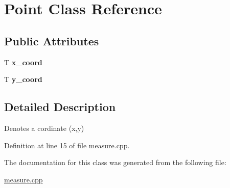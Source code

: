 \hypertarget{classPoint}{}\section{Point Class Reference}
\label{classPoint}
\subsection*{Public Attributes}
\begin{DoxyCompactItemize}
\item 
\mbox{\label{classPoint_a4a2a3771336f516660cf5bb95dd6895f}} 
T {\bfseries x\+\_\+coord}
\item 
\mbox{\label{classPoint_ab5babcbd7dce457f742082ca27b61073}} 
T {\bfseries y\+\_\+coord}
\end{DoxyCompactItemize}


\subsection{Detailed Description}
Denotes a cordinate (x,y) 

Definition at line 15 of file measure.\+cpp.



The documentation for this class was generated from the following file\+:\begin{DoxyCompactItemize}
\item 
\hyperlink{measure_8cpp}{measure.\+cpp}\end{DoxyCompactItemize}
